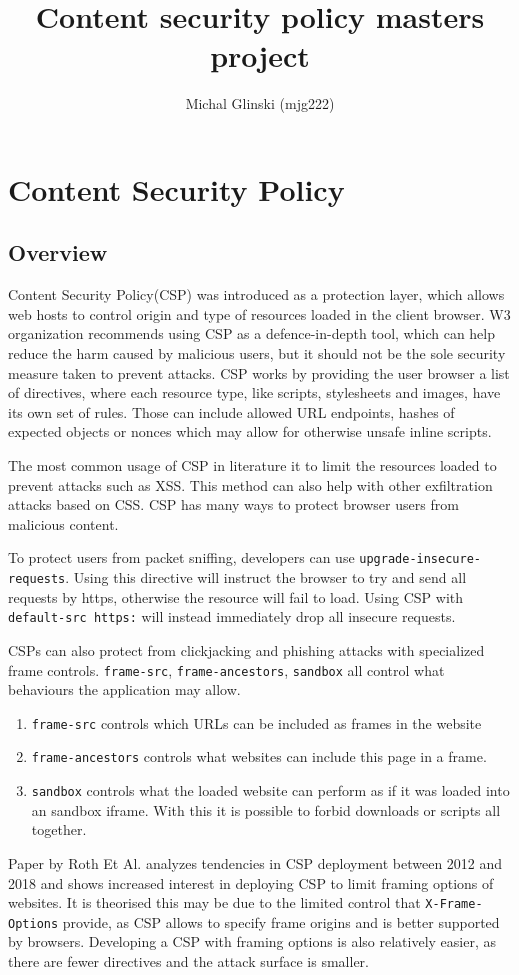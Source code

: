 \documentclass[12]{article}   %
\begin{document}
\title{Content security policy masters project} 
\author{Michal Glinski (mjg222)}    

\maketitle

\section{Content Security Policy}
\subsection{Overview}
Content Security Policy(CSP) was introduced as a protection layer, which allows web hosts to control origin and type of resources loaded in the client browser. 
W3 organization recommends using CSP as a defence-in-depth tool, which can help reduce the harm caused by malicious users, but it should not be the sole security measure taken to prevent attacks. \cite{CSPLevel3}
CSP works by providing the user browser a list of directives, where each resource type, like scripts, stylesheets and images, have its own set of rules.
Those can include allowed URL endpoints, hashes of expected objects or nonces which may allow for otherwise unsafe inline scripts.

The most common usage of CSP in literature it to limit the resources loaded to prevent attacks such as XSS.
This method can also help with other exfiltration attacks based on CSS.
CSP has many ways to protect browser users from malicious content.

To protect users from packet sniffing, developers can use \texttt{upgrade-insecure-requests}.
Using this directive will instruct the browser to try and send all requests by https, otherwise the resource will fail to load.
Using CSP with \texttt{default-src https:} will instead immediately drop all insecure requests.

CSPs can also protect from clickjacking and phishing attacks with specialized frame controls. 
\texttt{frame-src}, \texttt{frame-ancestors}, \texttt{sandbox} all control what behaviours the application may allow.
\begin{enumerate}
	\item \texttt{frame-src} controls which URLs can be included as frames in the website
	\item \texttt{frame-ancestors} controls what websites can include this page in a frame. 
	\item \texttt{sandbox} controls what the loaded website can perform as if it was loaded into an sandbox iframe. With this it is possible to forbid downloads or scripts all together.
\end{enumerate}
Paper by Roth Et Al. analyzes tendencies in CSP deployment between 2012 and 2018 and shows increased interest in deploying CSP to limit framing options of websites. \cite{osti_10173479}
It is theorised this may be due to the limited control that \texttt{X-Frame-Options} provide, as CSP allows to specify frame origins and is better supported by browsers.
Developing a CSP with framing options is also relatively easier, as there are fewer directives and the attack surface is smaller.
\end{document}
